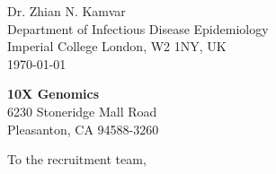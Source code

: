 


\clearpage
\begin{flushright}
  Dr. Zhian N. Kamvar\\
  Department of Infectious Disease Epidemiology\\
  Imperial College London, W2 1NY, UK\\
  \today
\end{flushright}

\textbf{10X Genomics}\\
6230 Stoneridge Mall Road\\
Pleasanton, CA 94588-3260





\vspace{1ex}
To the recruitment team,

\vspace{1ex}

